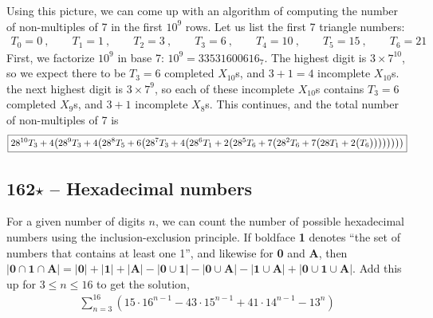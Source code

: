 \documentclass{article}
\begin{document}
Using this picture, we can come up with an algorithm of computing the number of non-multiples of 7 in the first $10^9$ rows.
Let us list the first 7 triangle numbers:
\begin{align*}
	T_0 = 0~, \qquad T_1 = 1~, \qquad T_2 = 3 ~, \qquad T_3 = 6 ~,\qquad T_4 = 10 ~,\qquad T_5 = 15 ~, \qquad T_6 = 21
\end{align*}
First, we factorize $10^9$ in base 7: $10^9 = 33531600616_7$.
The highest digit is $3 \times 7^{10}$, so we expect there to be $T_3 = 6$ completed $X_{10}$s, and $3+1 = 4$ incomplete $X_{10}$s.
the next highest digit is $3 \times 7^9$, so each of these incomplete $X_{10}$s contains $T_3 = 6$ completed $X_9$s, and $3+1$ incomplete $X_8$s.
This continues, and the total number of non-multiples of 7 is
\begin{align*}
	\boxed{ 28^{10} T_3 + 4 \qty( 28^9 T_3 + 4 \qty( 28^8 T_5 + 6 \qty( 28^7 T_3 + 4 \qty( 28^6 T_1 + 2 \qty( 28^5 T_6 + 7 \qty( 28^2 T_6 + 7 \qty\big( 28 T_1 + 2 \qty\big( T_6 )))))))) } 
\end{align*}


\subsection*{162$\star$ -- Hexadecimal numbers} 
For a given number of digits $n$, we can count the number of possible hexadecimal numbers using the inclusion-exclusion principle. 
If boldface \textbf{1} denotes ``the set of numbers that contains at least one 1'', and likewise for \textbf{0} and \textbf{A}, then $|\mathbf{0} \cap \mathbf{1} \cap \mathbf{A}| = |\mathbf{0}| + |\mathbf{1}| + |\mathbf{A}| - |\mathbf{0} \cup \mathbf{1}| - |\mathbf{0} \cup \mathbf{A}| - |\mathbf{1} \cup \mathbf{A}| + |\mathbf{0} \cup \mathbf{1} \cup \mathbf{A}|$.
Add this up for $3 \leq n \leq 16$ to get the solution, 
\begin{align*}
	\boxed{ \sum_{n=3}^{16} \left(15 \cdot 16^{n-1} - 43 \cdot 15^{n-1} + 41 \cdot 14^{n-1} - 13^n\right) } 
\end{align*}
\end{document}
